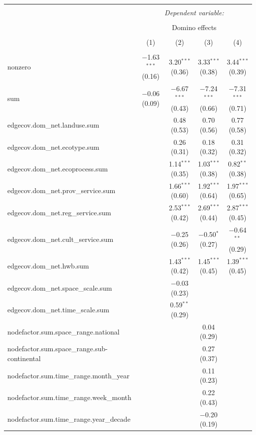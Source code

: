 \documentclass[9pt,]{article}
\begin{document}
\begin{tabular}{@{\extracolsep{5pt}}lcccc}
\\[-1.8ex]\hline
\hline \\[-1.8ex]
 & \multicolumn{4}{c}{\textit{Dependent variable:}} \\
\cline{2-5}
\\[-1.8ex] & \multicolumn{4}{c}{Domino effects} \\
\\[-1.8ex] & (1) & (2) & (3) & (4)\\
\hline \\[-1.8ex]
 nonzero & $-$1.63$^{***}$ (0.16) & 3.20$^{***}$ (0.36) & 3.33$^{***}$ (0.38) & 3.44$^{***}$ (0.39) \\
  sum & $-$0.06 (0.09) & $-$6.67$^{***}$ (0.43) & $-$7.24$^{***}$ (0.66) & $-$7.31$^{***}$ (0.71) \\
  edgecov.dom\_net.landuse.sum &  & 0.48 (0.53) & 0.70 (0.56) & 0.77 (0.58) \\
  edgecov.dom\_net.ecotype.sum &  & 0.26 (0.31) & 0.18 (0.32) & 0.31 (0.32) \\
  edgecov.dom\_net.ecoprocess.sum &  & 1.14$^{***}$ (0.35) & 1.03$^{***}$ (0.38) & 0.82$^{**}$ (0.38) \\
  edgecov.dom\_net.prov\_service.sum &  & 1.66$^{***}$ (0.60) & 1.92$^{***}$ (0.64) & 1.97$^{***}$ (0.65) \\
  edgecov.dom\_net.reg\_service.sum &  & 2.53$^{***}$ (0.42) & 2.69$^{***}$ (0.44) & 2.87$^{***}$ (0.45) \\
  edgecov.dom\_net.cult\_service.sum &  & $-$0.25 (0.26) & $-$0.50$^{*}$ (0.27) & $-$0.64$^{**}$ (0.29) \\
  edgecov.dom\_net.hwb.sum &  & 1.43$^{***}$ (0.42) & 1.45$^{***}$ (0.45) & 1.39$^{***}$ (0.45) \\
  edgecov.dom\_net.space\_scale.sum &  & $-$0.03 (0.23) &  &  \\
  edgecov.dom\_net.time\_scale.sum &  & 0.59$^{**}$ (0.29) &  &  \\
  nodefactor.sum.space\_range.national &  &  & 0.04 (0.29) &  \\
  nodefactor.sum.space\_range.sub-continental &  &  & 0.27 (0.37) &  \\
  nodefactor.sum.time\_range.month\_year &  &  & 0.11 (0.23) &  \\
  nodefactor.sum.time\_range.week\_month &  &  & 0.22 (0.43) &  \\
  nodefactor.sum.time\_range.year\_decade &  &  & $-$0.20 (0.19) &  \\

\end{tabular}
\end{document}
